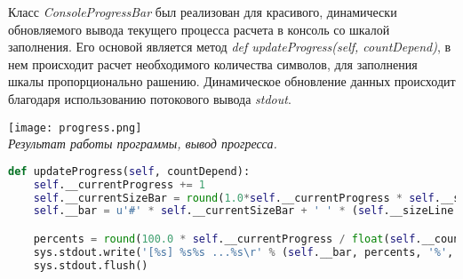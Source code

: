      Класс \textit{ConsoleProgressBar} был реализован для красивого, динамически обновляемого вывода текущего процесса расчета в консоль со шкалой заполнения. Его основой является метод \textit{def updateProgress(self, countDepend)}, в нем происходит расчет необходимого количества символов, для заполнения шкалы пропорционально рашению. Динамическое обновление данных происходит благодаря использованию потокового вывода \textit{stdout}.

     \begin{center}
        \texttt{[image: progress.png]}\\
        \textit{Результат работы программы, вывод прогресса.}
    \end{center}


     \begin{lstlisting}[language=Python]
def updateProgress(self, countDepend):
    self.__currentProgress += 1
    self.__currentSizeBar = round(1.0*self.__currentProgress * self.__sizeIterable)
    self.__bar = u'#' * self.__currentSizeBar + ' ' * (self.__sizeLine - self.__currentSizeBar)

    percents = round(100.0 * self.__currentProgress / float(self.__countIteration), 1)
    sys.stdout.write('[%s] %s%s ...%s\r' % (self.__bar, percents, '%', " Найдено зависимостей: "+str(countDepend)+" из "+ str(self.__currentProgress) + " проверенных. "))
    sys.stdout.flush()
     \end{lstlisting}


